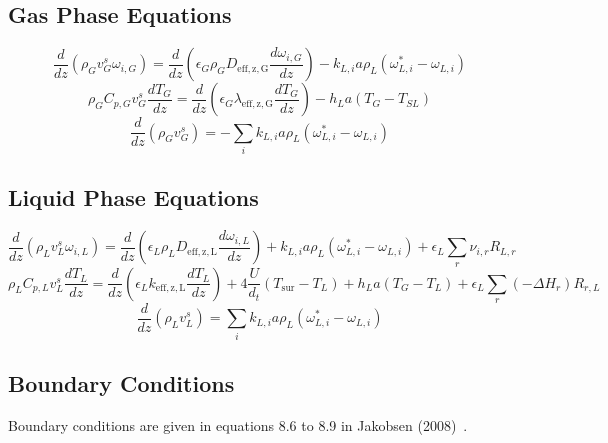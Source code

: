\documentclass{article}
\begin{document}
\subsection{Gas Phase Equations}
\begin{equation}
	\frac{d}{dz}\left(\rho_G v_G^s \omega_{i,G} \right) = \frac{d}{dz}\left(\epsilon_G\rho_GD_{\mathrm{eff,z,G}}\frac{d\omega_{i,G}}{dz} \right) - k_{L,i}a\rho_L(\omega_{L,i}^*-\omega_{L,i}) 
	\label{eq:component_balance_gas}
\end{equation}
\begin{equation}	
	\rho_GC_{p,G}v_G^s\frac{dT_G}{dz} = \frac{d}{dz}\left(\epsilon_G\lambda_{\mathrm{eff,z,G}}\frac{dT_G}{dz}\right) - h_La(T_G-T_{SL})
	\label{eq:energy_balance_gas}
\end{equation}
\begin{equation}
	\frac{d}{dz}\left(\rho_Gv_G^s\right) =-\sum_ik_{L,i}a\rho_L(\omega_{L,i}^*-\omega_{L,i})
	\label{eq:total_mass_balance_gas}
\end{equation}

\subsection{Liquid Phase Equations}
\begin{equation}
	\frac{d}{dz}\left(\rho_L v_L^s \omega_{i,L} \right) = \frac{d}{dz}\left(\epsilon_L\rho_LD_{\mathrm{eff,z,L}}\frac{d\omega_{i,L}}{dz} \right) + k_{L,i}a\rho_L(\omega_{L,i}^*-\omega_{L,i}) + \epsilon_L \sum_r\nu_{i,r}R_{L,r} 
	\label{eq:component_balance_liquid}
\end{equation}
\begin{equation}	
	\rho_LC_{p,L}v_L^s\frac{dT_L}{dz} = \frac{d}{dz}\left(\epsilon_Lk_{\mathrm{eff,z,L}}\frac{dT_L}{dz}\right) + 4 \frac{U}{d_t}(T_{\mathrm{sur}}-T_L) + h_La(T_G-T_L) + \epsilon_L\sum_r(-\Delta H_r)R_{r,L}
	\label{eq:energy_balance_liquid}
\end{equation}
\begin{equation}
	\frac{d}{dz}\left(\rho_Lv_L^s\right) =\sum_ik_{L,i}a\rho_L(\omega_{L,i}^*-\omega_{L,i})
	\label{eq:total_mass_balance_liquid}
\end{equation}

\subsection{Boundary Conditions}
Boundary conditions are given in equations 8.6 to 8.9 in Jakobsen (2008)~\cite{Jakobsen08}. 
\end{document}
